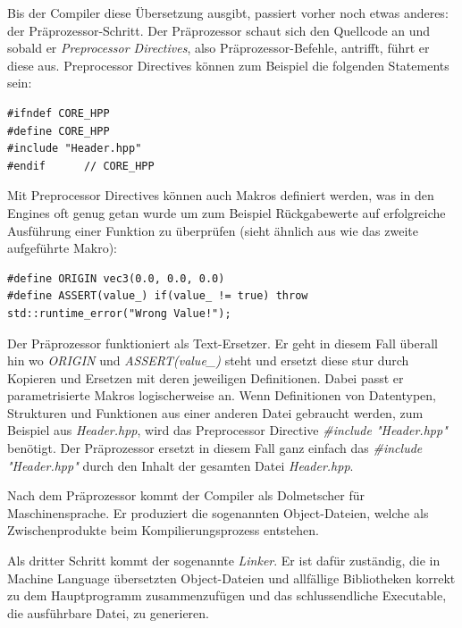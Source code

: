 \documentclass[titlepage, 11pt, a4paper, ngerman]{article}
\begin{document}
Bis der \gls{Compiler} diese Übersetzung ausgibt, passiert vorher noch etwas anderes: der Präprozessor-Schritt. Der Präprozessor schaut sich den Quellcode an und sobald er \textit{Preprocessor Directives}, also Präprozessor-Befehle, antrifft, führt er diese aus. Preprocessor Directives können zum Beispiel die folgenden Statements sein:
\begin{verbatim}
#ifndef CORE_HPP
#define CORE_HPP
#include "Header.hpp"
#endif      // CORE_HPP
\end{verbatim}
\bigbreak
Mit Preprocessor Directives können auch Makros definiert werden, was in den Engines oft genug getan wurde um zum Beispiel Rückgabewerte auf erfolgreiche Ausführung einer Funktion zu überprüfen (sieht ähnlich aus wie das zweite aufgeführte Makro):
\begin{verbatim}
#define ORIGIN vec3(0.0, 0.0, 0.0)
#define ASSERT(value_) if(value_ != true) throw std::runtime_error("Wrong Value!");
\end{verbatim}
\bigbreak
Der Präprozessor funktioniert als Text-Ersetzer. Er geht in diesem Fall überall hin wo \textit{ORIGIN} und \textit{ASSERT(value\_)} steht und ersetzt diese stur durch Kopieren und Ersetzen mit deren jeweiligen Definitionen. Dabei passt er parametrisierte Makros logischerweise an. Wenn Definitionen von Datentypen, Strukturen und Funktionen aus einer anderen Datei gebraucht werden, zum Beispiel aus \textit{Header.hpp}, wird das Preprocessor Directive \textit{\#include "Header.hpp"} benötigt. Der Präprozessor ersetzt in diesem Fall ganz einfach das \textit{\#include "Header.hpp"} durch den Inhalt der gesamten Datei \textit{Header.hpp}.\par
Nach dem Präprozessor kommt der \gls{Compiler} als Dolmetscher für Maschinensprache. Er produziert die sogenannten Object-Dateien, welche als Zwischenprodukte beim Kompilierungsprozess entstehen.\par
Als dritter Schritt kommt der sogenannte \textit{\gls{Linker}}. Er ist dafür zuständig, die in Machine Language übersetzten Object-Dateien und allfällige Bibliotheken korrekt zu dem Hauptprogramm zusammenzufügen und das schlussendliche Executable, die ausführbare Datei, zu generieren.
\end{document}

